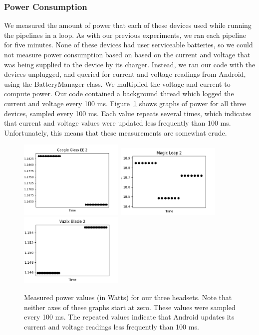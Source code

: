 \subsubsection{Power Consumption}

We measured the amount of power that each of these devices used while running
the pipelines in a loop.
As with our previous experiments, we ran each pipeline for five minutes.
None of these devices had user serviceable batteries, so we could not measure
power consumption based on based on the current and voltage that was being
supplied to the device by its charger.
Instead, we ran our code with the devices unplugged, and queried for current and
voltage readings from Android, using the BatteryManager class.
We multiplied the voltage and current to compute power.
Our code contained a background thread which logged the current and voltage
every 100 ms.
Figure~\ref{fig:power_graphs} shows graphs of power for all three devices,
sampled every 100 ms.
Each value repeats several times, which indicates that current and voltage
values were updated less frequently than 100 ms.
Unfortunately, this means that these measurements are somewhat crude.

\begin{figure}
  \includegraphics[width=5cm]{figures/power/glass_wattage.png}
  \includegraphics[width=5cm]{figures/power/magicleap_wattage.png}
  \includegraphics[width=5cm]{figures/power/vuzix_wattage.png}
  \caption{Measured power values (in Watts) for our three headsets.
    Note that neither axes of these graphs start at zero.
    These values were sampled every 100 ms.
    The repeated values indicate that Android updates its current and voltage
    readings less frequently than 100 ms.
  }\label{fig:power_graphs}
\end{figure}

